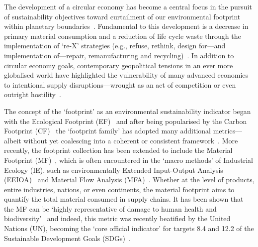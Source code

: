 \documentclass[a4paper,fleqn]{cas-dc}
\begin{document}
The development of a circular economy has become a central focus in the pursuit
of sustainability objectives toward curtailment of our environmental footprint
within planetary boundaries~\citep{eu2019greendeal,
	eu2020circ,nl2023ceplan,nl2016ceplan,pardo2018ce,ellenmacarthur2015ce}.
Fundamental to this development is a decrease in primary material consumption
and a reduction of life cycle waste through the implementation of `re-X'
strategies (e.g., refuse, rethink, design for---and implementation of---repair,
remanufacturing and recycling)~\citep{reike2018rex, eu2022ecodesign,
	eu2022repair, eu2015reman}. In addition to circular economy goals, contemporary
geopolitical tensions in an ever more globalised world have highlighted the
vulnerability of many advanced economies to intentional supply
disruptions---wrought as an act of competition or even outright
hostility~\citep{jrc2023supplychain,hartley2024cepolitics,berry2023crm}.

The concept of the `footprint' as an environmental sustainability indicator
began with the Ecological Footprint
(EF)~\citep{wackernagel1994ecologicalfootprint} and after being popularised by
the Carbon Footprint (CF)~\citep{cucek2015environmentalfootprints} the
`footprint family' has adopted many additional metrics---albeit without yet
coalescing into a coherent or consistent
framework~\citep{giampietro2014footprintstonowhere,
	vanham2019footprints,ridoutt2013footprints}. More recently, the footprint
collection has been extended to include the Material Footprint
(MF)~\citep{weidmann2013materialfootprint}, which is often encountered in the
`macro methods' of Industrial Ecology (IE), such as environmentally Extended
Input-Output Analysis (EEIOA)~\citep{lenzen2022materialfootprint} and Material
Flow Analysis (MFA)~\citep{schaffartzik2013mfafootprint}. Whether at the level
of products, entire industries, nations, or even continents, the material
footprint aims to quantify the total material consumed in supply chains. It has
been shown that the MF can be `highly representative of damage to human health
and biodiversity'~\citep{steinmann2017resourcefootprints} and indeed, this
metric was recently beatified by the United Nations (UN), becoming the `core
official indicator' for targets 8.4 and 12.2 of the Sustainable Development
Goals (SDGs)~\citep{lenzen2022materialfootprint}.
\end{document}
